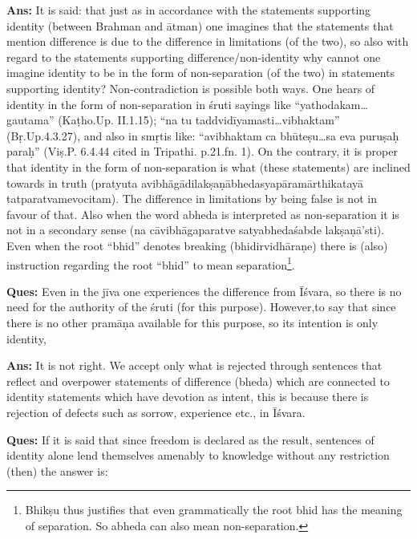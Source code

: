 \textbf{Ans:} It is said: that just as in accordance with the statements supporting identity (between Brahman and ātman) one imagines that the statements that mention difference  is due to the difference in limitations (of the two), so also with regard to the statements supporting difference/non-identity why cannot one imagine identity to be in the form of non-separation (of the two) in statements supporting identity? Non-contradiction is possible both ways. One hears of identity in the form of non-separation in śruti sayings like “yathodakam…gautama” (Kaṭho.Up. II.1.15); “na tu taddvidīyamasti…vibhaktam” (Bṛ.Up.4.3.27), and also in smṛtis like: “avibhaktam ca bhūteṣu…sa eva puruṣaḥ paraḥ” (Viṣ.P. 6.4.44 cited in Tripathi. p.21.fn. 1). On the contrary, it is proper that identity in the form of non-separation is what (these statements) are inclined towards in truth (pratyuta avibhāgādilakṣaṇābhedasya\break pāramārthikatayā tatparatvamevocitam). The difference in limitations by being false is not in favour of that. Also when the word abheda is interpreted as non-separation it is not in a secondary sense (na cāvibhāgaparatve satyabhedaśabde lakṣaṇā’sti). Even when the root “bhid” denotes breaking (bhidirvidhāraṇe) there is (also) instruction regarding the root “bhid” to mean separation\footnote{Bhikṣu thus justifies that even grammatically the root bhid has the meaning of separation. So abheda can also mean non-separation.}.

\eject

\textbf{Ques:} Even in the jīva one experiences the difference from Īśvara, so there is no need for the authority of the śruti (for this purpose).  However,to say that  since there is no other pramāṇa available for this purpose, so its intention is only identity,

\textbf{Ans:} It is not right. We accept only what is rejected through sentences that reflect and overpower statements of difference (bheda) which are connected to identity statements which have devotion as intent, this is because there is rejection of defects such as sorrow, experience etc., in Īśvara.

\textbf{Ques:} If it is said that since freedom is declared as the result, sentences of identity alone lend themselves amenably to knowledge without any restriction (then) the answer is: 

